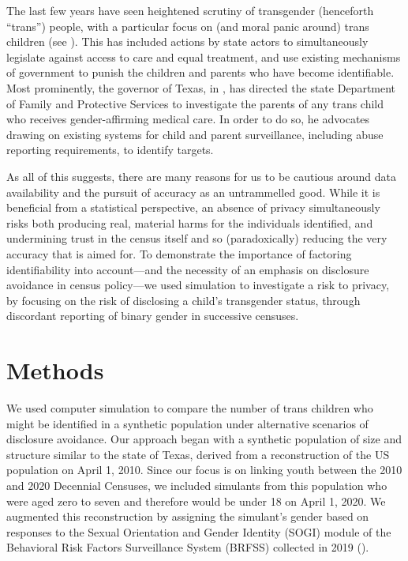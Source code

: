 \documentclass{jpc} %
\theoremstyle{plain}\newtheorem{satz}[thm]{Satz} %
\begin{document}
The last few years have seen heightened scrutiny of transgender (henceforth ``trans'') people, with a particular focus on (and moral panic around) trans children (see \cite{slothouber2020trans}). This has included actions by state actors to simultaneously legislate against access to care and equal treatment, and use existing mechanisms of government to punish the children and parents who have become identifiable. Most prominently, the governor of Texas, in \cite{abbottletter}, has directed the state Department of Family and Protective Services to investigate the parents of any trans child who receives gender-affirming medical care. In order to do so, he advocates drawing on existing systems for child and parent surveillance, including abuse reporting requirements, to identify targets.

As all of this suggests, there are many reasons for us to be cautious around data availability and the pursuit of accuracy as an untrammelled good. While it is beneficial from a statistical perspective, an absence of privacy simultaneously risks both producing real, material harms for the individuals identified, and undermining trust in the census itself and so (paradoxically) reducing the very accuracy that is aimed for. To demonstrate the importance of factoring identifiability into account---and the necessity of an emphasis on disclosure avoidance in census policy---we used simulation to investigate a risk to privacy, by focusing on the risk of disclosing a child's transgender status, through discordant reporting of binary gender in successive censuses.

\section*{Methods}

We used computer simulation to compare the number of trans children who might be identified in a synthetic population under alternative scenarios of disclosure avoidance.  Our approach began with a synthetic population of size and structure similar to the state of Texas, derived from a reconstruction of the US population on April 1, 2010.  Since our focus is on linking youth between the 2010 and 2020 Decennial Censuses, we included simulants from this population who were aged zero to seven and therefore would be under 18 on April 1, 2020.  We augmented this reconstruction by assigning the simulant's gender based on responses to the Sexual Orientation and Gender Identity (SOGI) module of the Behavioral Risk Factors Surveillance System (BRFSS) collected in 2019 (\cite{brfss2019}). %
\end{document}
